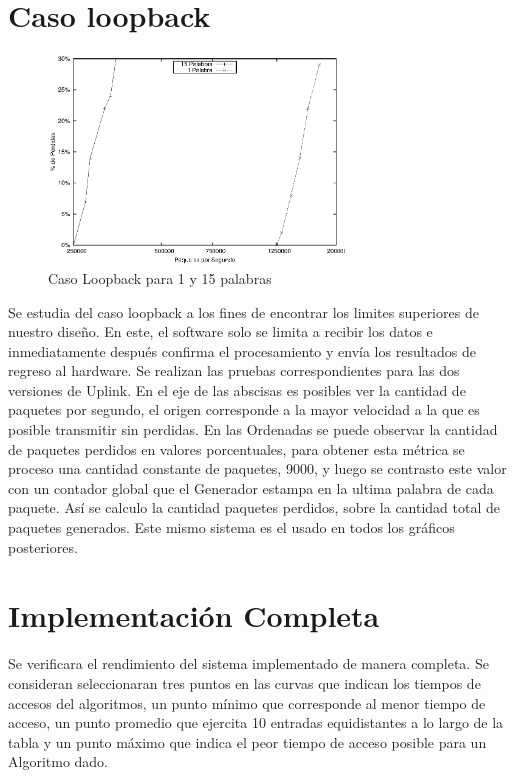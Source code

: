 \section{Caso loopback}
\begin{figure}[h]
  \centering
	\includegraphics[width=0.70\textwidth]{5-resultados/graf/loop.eps}
  \caption{Caso Loopback para 1 y 15 palabras}
  \label{fig}
\end{figure}
Se estudia del caso loopback a los fines de encontrar los limites superiores de nuestro diseño. En este, el software solo se limita a recibir los datos e inmediatamente después confirma el procesamiento y envía los resultados de regreso al hardware. Se realizan las pruebas correspondientes para las dos versiones de Uplink.
En el eje de las abscisas es posibles ver la cantidad de paquetes por segundo, el origen corresponde a la mayor velocidad a la que es posible transmitir sin perdidas. En las Ordenadas se puede observar la cantidad de paquetes perdidos en valores porcentuales, para obtener esta métrica se proceso una cantidad constante de paquetes, 9000, y luego se contrasto este valor con un contador global que el Generador estampa en la ultima palabra de cada paquete. Así se calculo la cantidad paquetes perdidos, sobre la cantidad total de paquetes generados. Este mismo sistema es el usado en todos los gráficos posteriores.


\newpage
\section{Implementación Completa}

Se verificara el rendimiento del sistema implementado de manera completa. Se consideran seleccionaran tres puntos en las curvas que indican los tiempos de accesos del algoritmos, un punto mínimo que corresponde al menor tiempo de acceso, un punto promedio que ejercita 10 entradas equidistantes a lo largo de la tabla y un punto máximo que indica el peor tiempo de acceso posible para un Algoritmo dado. 

